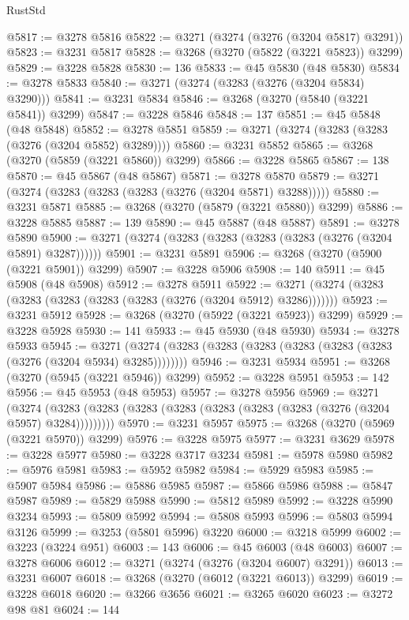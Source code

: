 \begin{lexlean}{RustStd}
\begin{coremodule}
@5817 := @3278 @5816
@5822 := @3271 (@3274 (@3276 (@3204 @5817) @3291))
@5823 := @3231 @5817
@5828 := @3268 (@3270 (@5822 (@3221 @5823)) @3299)
@5829 := @3228 @5828
@5830 := 136
@5833 := @45 @5830 (@48 @5830)
@5834 := @3278 @5833
@5840 := @3271 (@3274 (@3283 (@3276 (@3204 @5834) @3290)))
@5841 := @3231 @5834
@5846 := @3268 (@3270 (@5840 (@3221 @5841)) @3299)
@5847 := @3228 @5846
@5848 := 137
@5851 := @45 @5848 (@48 @5848)
@5852 := @3278 @5851
@5859 := @3271 (@3274 (@3283 (@3283 (@3276 (@3204 @5852) @3289))))
@5860 := @3231 @5852
@5865 := @3268 (@3270 (@5859 (@3221 @5860)) @3299)
@5866 := @3228 @5865
@5867 := 138
@5870 := @45 @5867 (@48 @5867)
@5871 := @3278 @5870
@5879 := @3271 (@3274 (@3283 (@3283 (@3283 (@3276 (@3204 @5871) @3288)))))
@5880 := @3231 @5871
@5885 := @3268 (@3270 (@5879 (@3221 @5880)) @3299)
@5886 := @3228 @5885
@5887 := 139
@5890 := @45 @5887 (@48 @5887)
@5891 := @3278 @5890
@5900 := @3271 (@3274 (@3283 (@3283 (@3283 (@3283 (@3276 (@3204 @5891) @3287))))))
@5901 := @3231 @5891
@5906 := @3268 (@3270 (@5900 (@3221 @5901)) @3299)
@5907 := @3228 @5906
@5908 := 140
@5911 := @45 @5908 (@48 @5908)
@5912 := @3278 @5911
@5922 := @3271 (@3274 (@3283 (@3283 (@3283 (@3283 (@3283 (@3276 (@3204 @5912) @3286)))))))
@5923 := @3231 @5912
@5928 := @3268 (@3270 (@5922 (@3221 @5923)) @3299)
@5929 := @3228 @5928
@5930 := 141
@5933 := @45 @5930 (@48 @5930)
@5934 := @3278 @5933
@5945 := @3271 (@3274 (@3283 (@3283 (@3283 (@3283 (@3283 (@3283 (@3276 (@3204 @5934) @3285))))))))
@5946 := @3231 @5934
@5951 := @3268 (@3270 (@5945 (@3221 @5946)) @3299)
@5952 := @3228 @5951
@5953 := 142
@5956 := @45 @5953 (@48 @5953)
@5957 := @3278 @5956
@5969 := @3271
    (@3274 (@3283 (@3283 (@3283 (@3283 (@3283 (@3283 (@3283 (@3276 (@3204 @5957) @3284)))))))))
@5970 := @3231 @5957
@5975 := @3268 (@3270 (@5969 (@3221 @5970)) @3299)
@5976 := @3228 @5975
@5977 := @3231 @3629
@5978 := @3228 @5977
@5980 := @3228 @3717 @3234
@5981 := @5978 @5980
@5982 := @5976 @5981
@5983 := @5952 @5982
@5984 := @5929 @5983
@5985 := @5907 @5984
@5986 := @5886 @5985
@5987 := @5866 @5986
@5988 := @5847 @5987
@5989 := @5829 @5988
@5990 := @5812 @5989
@5992 := @3228 @5990 @3234
@5993 := @5809 @5992
@5994 := @5808 @5993
@5996 := @5803 @5994 @3126
@5999 := @3253 (@5801 @5996) @3220
@6000 := @3218 @5999
@6002 := @3223 (@3224 @951)
@6003 := 143
@6006 := @45 @6003 (@48 @6003)
@6007 := @3278 @6006
@6012 := @3271 (@3274 (@3276 (@3204 @6007) @3291))
@6013 := @3231 @6007
@6018 := @3268 (@3270 (@6012 (@3221 @6013)) @3299)
@6019 := @3228 @6018
@6020 := @3266 @3656
@6021 := @3265 @6020
@6023 := @3272 @98 @81
@6024 := 144

\end{coremodule}
\end{lexlean}
